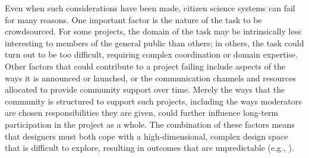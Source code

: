 \documentclass{sigchi}
\begin{document}



Even when such considerations have been made, citizen science systems can fail for many reasons. One important factor is the nature of the task to be crowdsourced. For some projects, the domain of the task may be intrinsically less interesting to members of the general public than others; in others, the task could turn out to be too difficult, requiring complex coordination or domain expertise. Other factors that could contribute to a project failing include aspects of the ways it is announced or launched, or the communication channels and resources allocated to provide community support over time.  Merely the ways that the community is structured to support such projects, including the ways moderators are chosen responsibilities they are given, could further influence long-term participation in the project as a whole. The combination of these factors means that designers must both cope with a high-dimensional, complex design space that is difficult to explore, resulting in outcomes that are unpredictable (e.g., \cite{ebird, ubiome, druschke2012failures}).
\end{document}
